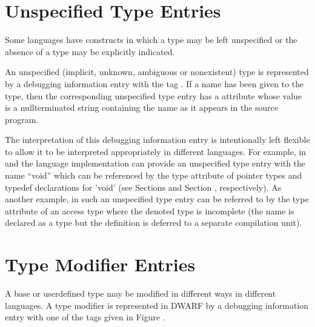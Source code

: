 \section{Unspecified Type Entries}
\label{chap:unspecifiedtypeentries}
Some languages have constructs in which a type 
may be left unspecified or the absence of a type
may be explicitly indicated.

An unspecified (implicit, unknown, ambiguous or nonexistent)
type is represented by a debugging information entry with
the tag . 
If a name has been given
to the type, then the corresponding unspecified type entry
has a  attribute 
whose value is
a null\dash terminated
string containing the name as it appears in the source program.

The interpretation of this debugging information entry is
intentionally left flexible to allow it to be interpreted
appropriately in different languages. For example, in 
 and 
the language implementation can provide an unspecified type
entry with the name “void” which can be referenced by the
type attribute of pointer types and typedef declarations for
'void' (see 
Sections  and 
Section , 
respectively). As another
example, in  such an unspecified type entry can be referred
to by the type attribute of an access type where the denoted
type is incomplete (the name is declared as a type but the
definition is deferred to a separate compilation unit).

\section{Type Modifier Entries}
\label{chap:typemodifierentries}

A base or user\dash defined type may be modified in different ways
in different languages. 
A type modifier is represented in
DWARF by a debugging information entry with one of the tags
given in 
Figure .

